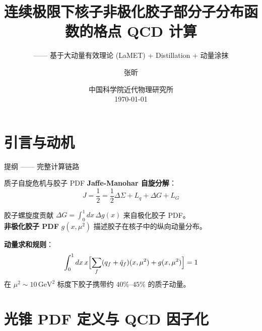 \documentclass[10pt,aspectratio=169]{beamer}
\newcommand{\GeV}{\,\mathrm{GeV}}
\begin{document}
\section{引言与动机}

\begin{frame}
\title{连续极限下核子非极化胶子部分子分布函数的格点 QCD 计算}
\subtitle{—— 基于大动量有效理论 (LaMET) + Distillation + 动量涂抹}
\author{张昕}
\date{中国科学院近代物理研究所 \\ \today}
\titlepage
\end{frame}

\begin{frame}{提纲 —— 完整计算链路}
\tableofcontents[hideallsubsections]
\end{frame}

\begin{frame}{质子自旋危机与胶子 PDF}
\small
\textbf{Jaffe-Manohar 自旋分解}：
\begin{equation}
  J = \frac{1}{2} = \frac{1}{2}\Delta\Sigma + L_q + \Delta G + L_G
\end{equation}

胶子螺旋度贡献 $\Delta G = \int_0^1 dx \, \Delta g(x)$ 来自极化胶子 PDF。\\
\textbf{非极化胶子 PDF} $g(x,\mu^2)$ 描述胶子在核子中的纵向动量分布。

\textbf{动量求和规则}：
\begin{equation}
  \int_0^1 dx\,x\Bigl[\sum_f (q_f + \bar{q}_f)(x,\mu^2) + g(x,\mu^2)\Bigr] = 1
\end{equation}
在 $\mu^2 \sim 10\GeV^2$ 标度下胶子携带约 $40\%$--$45\%$ 的质子动量。

\begin{center}
\end{center}
\end{frame}

\section{光锥 PDF 定义与 QCD 因子化}
\end{document}
